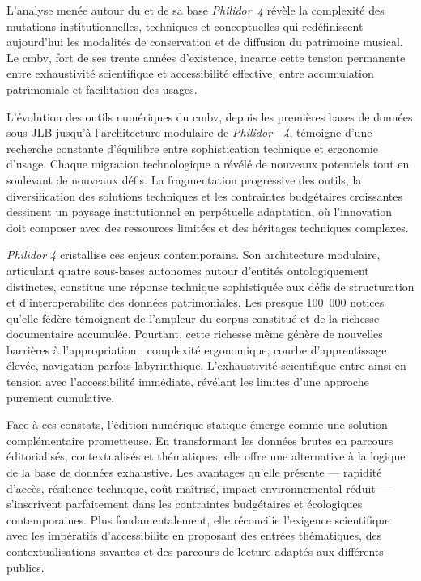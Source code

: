 L'analyse menée autour du  et de sa base \textit{Philidor~4} révèle la complexité des mutations institutionnelles, techniques et conceptuelles qui redéfinissent aujourd'hui les modalités de conservation et de diffusion du patrimoine musical. Le \gls{cmbv}, fort de ses trente années d'existence, incarne cette tension permanente entre exhaustivité scientifique et accessibilité effective, entre accumulation patrimoniale et facilitation des usages.

L'évolution des outils numériques du \gls{cmbv}, depuis les premières bases de données sous JLB jusqu'à l'architecture modulaire de \textit{Philidor~~4}, témoigne d'une recherche constante d'équilibre entre sophistication technique et ergonomie d'usage. Chaque migration technologique a révélé de nouveaux potentiels tout en soulevant de nouveaux défis. La fragmentation progressive des outils, la diversification des solutions techniques et les contraintes budgétaires croissantes dessinent un paysage institutionnel en perpétuelle adaptation, où l'innovation doit composer avec des ressources limitées et des héritages techniques complexes.

\textit{Philidor 4} cristallise ces enjeux contemporains. Son architecture modulaire, articulant quatre sous-bases autonomes autour d'entités ontologiquement distinctes, constitue une réponse technique sophistiquée aux défis de structuration et d'\gls{interoperabilite} des données patrimoniales. Les presque 100~000 notices qu'elle fédère témoignent de l'ampleur du corpus constitué et de la richesse documentaire accumulée. Pourtant, cette richesse même génère de nouvelles barrières à l'appropriation : complexité ergonomique, courbe d'apprentissage élevée, navigation parfois labyrinthique. L'exhaustivité scientifique entre ainsi en tension avec l'accessibilité immédiate, révélant les limites d'une approche purement cumulative.

Face à ces constats, l'édition numérique statique émerge comme une solution complémentaire prometteuse. En transformant les données brutes en parcours éditorialisés, contextualisés et thématiques, elle offre une alternative à la logique de la base de données exhaustive. Les avantages qu'elle présente --- rapidité d'accès, résilience technique, coût maîtrisé, impact environnemental réduit --- s'inscrivent parfaitement dans les contraintes budgétaires et écologiques contemporaines. Plus fondamentalement, elle réconcilie l'exigence scientifique avec les impératifs d'\gls{accessibilite} en proposant des entrées thématiques, des contextualisations savantes et des parcours de lecture adaptés aux différents publics.

